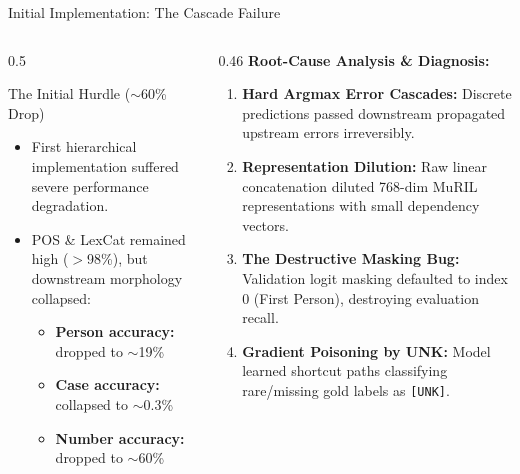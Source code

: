 \documentclass[aspectratio=169, 10pt]{beamer}
\begin{document}
\begin{frame}{Initial Implementation: The Cascade Failure}
  \begin{columns}[T]
    \begin{column}{0.5\textwidth}
      \begin{alertblock}{The Initial Hurdle ($\sim$60\% Drop)}
        \begin{itemize}
          \item First hierarchical implementation suffered severe performance degradation.
          \item POS \& LexCat remained high ($>$98\%), but downstream morphology collapsed:
          \begin{itemize}
            \item \textbf{Person accuracy:} dropped to $\sim$19\%
            \item \textbf{Case accuracy:} collapsed to $\sim$0.3\%
            \item \textbf{Number accuracy:} dropped to $\sim$60\%
          \end{itemize}
        \end{itemize}
      \end{alertblock}
    \end{column}

    \begin{column}{0.46\textwidth}
      \textbf{Root-Cause Analysis \& Diagnosis:}
      \begin{enumerate}
        \item \textbf{Hard Argmax Error Cascades:} Discrete predictions passed downstream propagated upstream errors irreversibly.
        \item \textbf{Representation Dilution:} Raw linear concatenation diluted 768-dim MuRIL representations with small dependency vectors.
        \item \textbf{The Destructive Masking Bug:} Validation logit masking defaulted to index 0 (First Person), destroying evaluation recall.
        \item \textbf{Gradient Poisoning by UNK:} Model learned shortcut paths classifying rare/missing gold labels as \texttt{[UNK]}.
      \end{enumerate}
    \end{column}
  \end{columns}
\end{frame}
\end{document}

